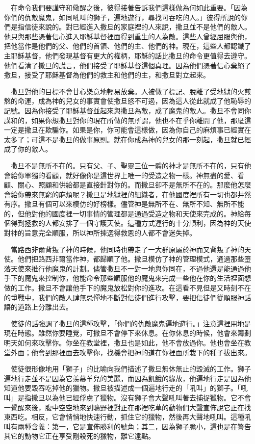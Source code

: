 \documentclass{book}
\begin{document}
　在命令我們要謹守和儆醒之後，彼得接著告訴我們這樣做為何如此重要。「因為你們的仇敵魔鬼，如同吼叫的獅子，遍地遊行，尋找可吞吃的人。」彼得所說的你們是指信徒來說的。對已經進入撒旦的家庭裡的人來說，撒旦並不是他們的敵人。他只與那些憑著信心進入耶穌基督裡面得到重生的人為敵。這些人曾經屈服與他，把他當作是他們的父、他們的首領、他們的主、他們的神。現在，這些人都認識了主耶穌基督，他們發現基督有更大的權柄，耶穌的話比撒旦的命令更值得去遵守。他們看清了撒旦的謊言，他們接受了耶穌基督這個真理。因為他們憑著信心棄絕了撒旦，接受了耶穌基督為他們的救主和他們的主，和撒旦對立起來。

　撒旦對他的目標不會甘心樂意地輕易放棄。人被做了標記、脫離了受地獄的火煎熬的命運，成為神的兒女的事實會使撒旦怒不可遏，因為這人從此就成了他恥辱的記號。因為你接受了耶穌基督並起來與撒旦為敵，成了魔鬼的敵人。撒旦不會同你講和的，如果你想撒旦對你的現在所做的無所謂，他也不在乎你離開了他，那麼這一定是撒旦在欺騙你。如果是你，你可能會這樣做，因為你自己的麻煩事已經實在太多了；可這不是撒旦的做事原則。就在你成為神的兒女的那一刻起，撒旦就已經成了你的敵人。

　撒旦不是無所不在的。只有父、子、聖靈三位一體的神才是無所不在的，只有他會給你單獨的看顧，就好像你是這世界上唯一的受造之物一樣。神無盡的愛、看顧、關心、照顧和供給都是直接針對你的。而撒旦卻不是無所不在的。那麼他怎麼會給你帶來無窮的麻煩呢？撒旦是地獄裡的組織者，在他國度裡所有一切也都井然有序。撒旦有個可以來模仿的好榜樣。儘管神是無所不在、無所不知、無所不能的，但他對他的國度裡一切事情的管理都是通過受造之物和天使來完成的。神給每個得到拯救的人都安排了一個守護天使。這種方式運行的十分順利，因為神的天使對神的旨意完全順服，所以神所揀選得救恩的人都不會迷失掉。

　當路西非爾背叛了神的時候，他同時也帶走了一大群原屬於神而又背叛了神的天使。他們把路西非爾當作神，都歸順了他。撒旦模仿了神的管理模式，通過那些墮落天使來推行他魔鬼的計劃。儘管撒旦不一對一地與你同在，不過他還是能通過他手下的魔鬼來控制你，他能命令那些順服他的魔鬼來完成一些他在你的生活裡面想做的工作。撒旦不會讓他手下的魔鬼放松對你的進攻。在這看不見但是又時刻不在的爭戰中，我們的敵人肆無忌憚地不斷對信徒們進行攻擊，要把信徒們從順服神話語的道路上分離出去。

　使徒的話強調了撒旦的這種攻擊，「你們的仇敵魔鬼遍地遊行。」注意這裡用地是現在時態。雖然你要睡覺，可撒旦不會停下來休息。在你休息的時候，他會來籌劃明天如何來攻擊你。你坐在教堂裡，撒旦也是如此，他不會放過你。他也會坐在教堂外面；他會到那裡面去攻擊你，找機會把神的道在你裡面所栽下的種子拔出來。

　使徒很形像地用「獅子」的比喻向我們描述了撒旦無休無止的毀滅的工作。獅子遍地行走並不是因為它羨慕羊兒的美麗，而因為飢餓的緣故，他遍地行走是因為他知道他要毀吞吃掉他的獵物。撒旦被描述成一個遍地行走的「吼叫」的獅子。「吼叫」是指撒旦以為他已經俘虜了獵物。沒有獅子會大聲吼叫著去捕捉獵物。它不會一覺醒來後，腹中空空地來到曠野裡對正在那裡吃草的動物們大聲宣佈說它正在找東西吃。相反，它會悄悄地快速行動，抓住它的獵物，然後再大聲地吼叫。這種吼叫有兩種含義：第一，它是宣佈勝利的號角；其二，因為獅子膽小，這也是在警告其它的動物它正在享受剛殺死的獵物，離它遠點。
\end{document}
